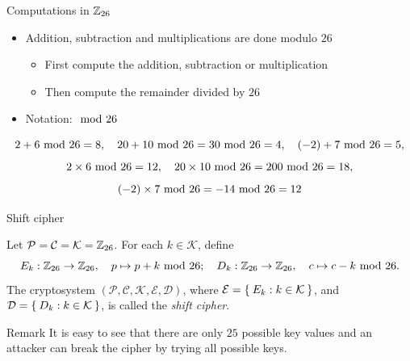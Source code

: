 \begin{frame}{Computations in ${\mathbb Z}_{26}$}
    \begin{itemize}
        \item Addition, subtraction and multiplications are done modulo $26$
        \begin{itemize}
            \item First compute the addition, subtraction or multiplication
            \item Then compute the remainder divided by $26$
        \end{itemize}
        \item Notation: $\textrm{~mod~} 26$
    \end{itemize}
    \begin{example}
    \[
    2+6\textrm{~mod~}26=8,\quad 20+10\textrm{~mod~}26=30\textrm{~mod~}26=4,\quad (-2)+7\textrm{~mod~}26=5,
    \]
    \[
    2\times6\textrm{~mod~}26=12,\quad 20\times10\textrm{~mod~}26=200\textrm{~mod~}26=18,
    \]
    \[
    (-2)\times7\textrm{~mod~}26=-14\textrm{~mod~}26=12
    \]
    \end{example}
\end{frame}

\begin{frame}{Shift cipher}
    \begin{definition}
Let $\mathcal{P}=\mathcal{C}=\mathcal{K}={\mathbb Z}_{26}$.
For each $k\in\mathcal{K}$, define
    \[
    E_k: {\mathbb Z}_{26}\to{\mathbb Z}_{26},\quad  p\mapsto p+k \textrm{~mod~} 26;
    \quad
    D_k: {\mathbb Z}_{26}\to{\mathbb Z}_{26},\quad  c\mapsto c-k \textrm{~mod~} 26.
    \]
The cryptosystem $(\mathcal{P},\mathcal{C},\mathcal{K},\mathcal{E},\mathcal{D})$, where $\mathcal{E}=\Set{E_k:k\in\mathcal{K}}$, and $\mathcal{D}=\Set{D_k:k\in\mathcal{K}}$, is called the \textit{shift cipher}.
\end{definition}
\begin{alertblock}{Remark}
    It is easy to see that there are only $25$ possible key values and an attacker can break the cipher by trying all possible keys.
\end{alertblock}
\end{frame}

